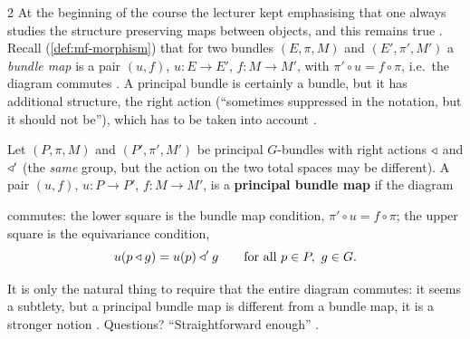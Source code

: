 \begin{paracol}{2}
At the beginning of the course the lecturer kept emphasising that one always studies the structure preserving maps between objects, and this remains true . Recall (\cref{def:mf-morphism}) that for two bundles $(E,\pi,M)$ and $(E',\pi',M')$ a \emph{bundle map} is a pair $(u,f)$, $u\colon E\to E'$, $f\colon M\to M'$, with $\pi'\circ u=f\circ\pi$, i.e.\ the diagram commutes   . A principal bundle is certainly a bundle, but it has additional structure, the right action (``sometimes suppressed in the notation, but it should not be''), which has to be taken into account   .

\begin{definition}\label{def:pb-pbmap}
Let $(P,\pi,M)$ and $(P',\pi',M')$ be principal $G$-bundles with right actions $\mathbin{\triangleleft}$ and $\mathbin{\triangleleft}'$ (the \emph{same} group, but the action on the two total spaces may be different). A pair $(u,f)$, $u\colon P\to P'$, $f\colon M\to M'$, is a \textbf{principal bundle map} if the diagram
\begin{center}
\end{center}
commutes: the lower square is the bundle map condition, $\pi'\circ u=f\circ\pi$; the upper square is the equivariance condition,
\[
  u(p\mathbin{\triangleleft} g)=u(p)\mathbin{\triangleleft}'g\qquad\text{for all }p\in P,\ g\in G .
\]
        
\end{definition}
It is only the natural thing to require that the entire diagram commutes: it seems a subtlety, but a principal bundle map is different from a bundle map, it is a stronger notion  . Questions? ``Straightforward enough'' .


\end{paracol}
